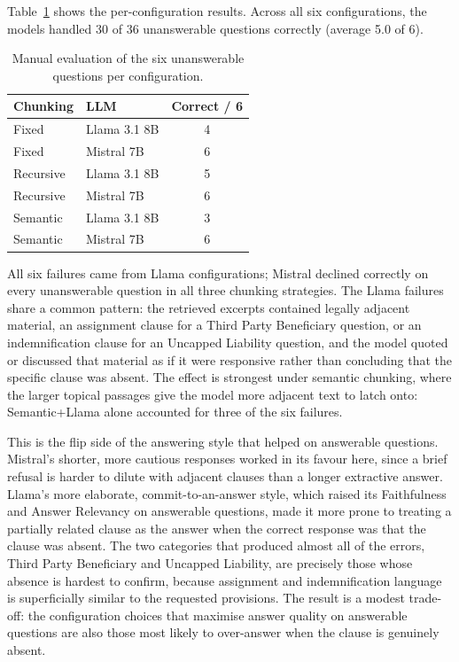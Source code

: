 Table~\ref{tab:unanswerable} shows the per-configuration results. Across all six configurations, the models handled 30 of 36 unanswerable questions correctly (average 5.0 of 6).

\begin{table}[ht]
\centering
\begin{tabular}{llc}
\toprule
\textbf{Chunking} & \textbf{LLM} & \textbf{Correct / 6} \\
\midrule
Fixed     & Llama 3.1 8B & 4 \\
Fixed     & Mistral 7B   & 6 \\
Recursive & Llama 3.1 8B & 5 \\
Recursive & Mistral 7B   & 6 \\
Semantic  & Llama 3.1 8B & 3 \\
Semantic  & Mistral 7B   & 6 \\
\bottomrule
\end{tabular}
\caption{Manual evaluation of the six unanswerable questions per configuration.}
\label{tab:unanswerable}
\end{table}

All six failures came from Llama configurations; Mistral declined correctly on every unanswerable question in all three chunking strategies. The Llama failures share a common pattern: the retrieved excerpts contained legally adjacent material, an assignment clause for a Third Party Beneficiary question, or an indemnification clause for an Uncapped Liability question, and the model quoted or discussed that material as if it were responsive rather than concluding that the specific clause was absent. The effect is strongest under semantic chunking, where the larger topical passages give the model more adjacent text to latch onto: Semantic+Llama alone accounted for three of the six failures.

This is the flip side of the answering style that helped on answerable questions. Mistral's shorter, more cautious responses worked in its favour here, since a brief refusal is harder to dilute with adjacent clauses than a longer extractive answer. Llama's more elaborate, commit-to-an-answer style, which raised its Faithfulness and Answer Relevancy on answerable questions, made it more prone to treating a partially related clause as the answer when the correct response was that the clause was absent. The two categories that produced almost all of the errors, Third Party Beneficiary and Uncapped Liability, are precisely those whose absence is hardest to confirm, because assignment and indemnification language is superficially similar to the requested provisions. The result is a modest trade-off: the configuration choices that maximise answer quality on answerable questions are also those most likely to over-answer when the clause is genuinely absent.



